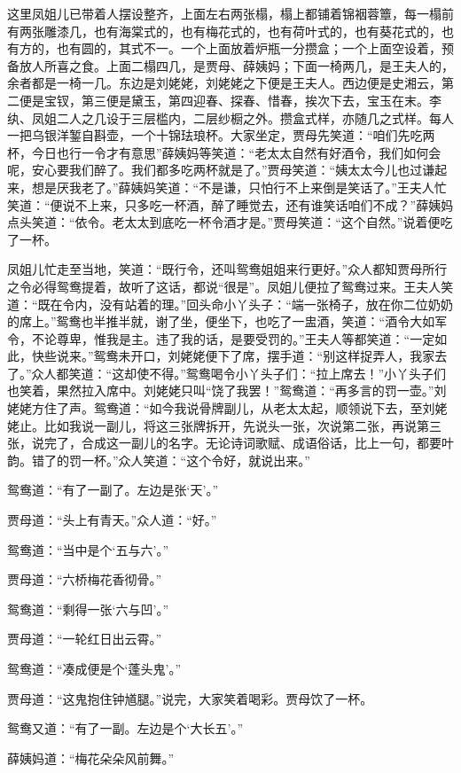 \documentclass[12pt,oneside]{book}
\begin{document}
这里凤姐儿已带着人摆设整齐，上面左右两张榻，榻上都铺着锦裀蓉簟，每一榻前有两张雕漆几，也有海棠式的，也有梅花式的，也有荷叶式的，也有葵花式的，也有方的，也有圆的，其式不一。一个上面放着炉瓶一分攒盒；一个上面空设着，预备放人所喜之食。上面二榻四几，是贾母、薛姨妈；下面一椅两几，是王夫人的，余者都是一椅一几。东边是刘姥姥，刘姥姥之下便是王夫人。西边便是史湘云，第二便是宝钗，第三便是黛玉，第四迎春、探春、惜春，挨次下去，宝玉在末。李纨、凤姐二人之几设于三层槛内，二层纱橱之外。攒盒式样，亦随几之式样。每人一把乌银洋錾自斟壶，一个十锦珐琅杯。大家坐定，贾母先笑道：“咱们先吃两杯，今日也行一令才有意思”薛姨妈等笑道：“老太太自然有好酒令，我们如何会呢，安心要我们醉了。我们都多吃两杯就是了。”贾母笑道：“姨太太今儿也过谦起来，想是厌我老了。”薛姨妈笑道：“不是谦，只怕行不上来倒是笑话了。”王夫人忙笑道：“便说不上来，只多吃一杯酒，醉了睡觉去，还有谁笑话咱们不成？”薛姨妈点头笑道：“依令。老太太到底吃一杯令酒才是。”贾母笑道：“这个自然。”说着便吃了一杯。

凤姐儿忙走至当地，笑道：“既行令，还叫鸳鸯姐姐来行更好。”众人都知贾母所行之令必得鸳鸯提着，故听了这话，都说“很是”。凤姐儿便拉了鸳鸯过来。王夫人笑道：“既在令内，没有站着的理。”回头命小丫头子：“端一张椅子，放在你二位奶奶的席上。”鸳鸯也半推半就，谢了坐，便坐下，也吃了一盅酒，笑道：“酒令大如军令，不论尊卑，惟我是主。违了我的话，是要受罚的。”王夫人等都笑道：“一定如此，快些说来。”鸳鸯未开口，刘姥姥便下了席，摆手道：“别这样捉弄人，我家去了。”众人都笑道：“这却使不得。”鸳鸯喝令小丫头子们：“拉上席去！”小丫头子们也笑着，果然拉入席中。刘姥姥只叫“饶了我罢！”鸳鸯道：“再多言的罚一壶。”刘姥姥方住了声。鸳鸯道：“如今我说骨牌副儿，从老太太起，顺领说下去，至刘姥姥止。比如我说一副儿，将这三张牌拆开，先说头一张，次说第二张，再说第三张，说完了，合成这一副儿的名字。无论诗词歌赋、成语俗话，比上一句，都要叶韵。错了的罚一杯。”众人笑道：“这个令好，就说出来。”

鸳鸯道：“有了一副了。左边是张‘天’。”

贾母道：“头上有青天。”众人道：“好。”

鸳鸯道：“当中是个‘五与六’。”

贾母道：“六桥梅花香彻骨。”

鸳鸯道：“剩得一张‘六与凹’。”

贾母道：“一轮红日出云霄。”

鸳鸯道：“凑成便是个‘蓬头鬼’。”

贾母道：“这鬼抱住钟馗腿。”说完，大家笑着喝彩。贾母饮了一杯。

鸳鸯又道：“有了一副。左边是个‘大长五’。”

薛姨妈道：“梅花朵朵风前舞。”
\end{document}
